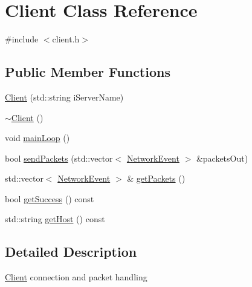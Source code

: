 \hypertarget{class_client}{\section{Client Class Reference}
\label{class_client}
}


{\ttfamily \#include $<$client.\-h$>$}

\subsection*{Public Member Functions}
\begin{DoxyCompactItemize}
\item 
\hyperlink{class_client_a7bfde03c1d803967f143e43f182f12d1}{Client} (std\-::string i\-Server\-Name)
\item 
\hyperlink{class_client_a840e519ca781888cbd54181572ebe3a7}{$\sim$\-Client} ()
\item 
void \hyperlink{class_client_a654ba5473ed09ebec6ab7c08e7a24c62}{main\-Loop} ()
\item 
bool \hyperlink{class_client_a99e1f6991bf2b4621a78ba939646f30f}{send\-Packets} (std\-::vector$<$ \hyperlink{class_network_event}{Network\-Event} $>$ \&packets\-Out)
\item 
std\-::vector$<$ \hyperlink{class_network_event}{Network\-Event} $>$ \& \hyperlink{class_client_a4b95752c68427742a66c792fd5885a5c}{get\-Packets} ()
\item 
bool \hyperlink{class_client_a9bf1bb055b99eae811954f41533a373d}{get\-Success} () const 
\item 
std\-::string \hyperlink{class_client_a056af8a9a28128d017c0b6b280204575}{get\-Host} () const 
\end{DoxyCompactItemize}


\subsection{Detailed Description}
\hyperlink{class_client}{Client} connection and packet handling 

